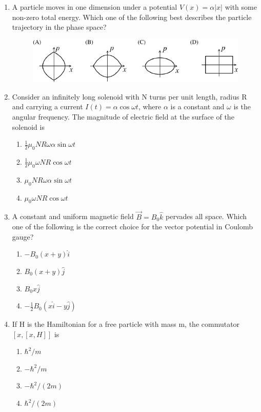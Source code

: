 \documentclass[journal,12pt,onecolumn]{IEEEtran}
\theoremstyle{remark}
\begin{document}
\begin{enumerate}
    \item A particle moves in one dimension under a potential $V(x) = \alpha |x|$ with some non-zero total energy. Which one of the following best describes the particle trajectory in the phase space?\hfill{}
    \begin{figure}[H]
        \centering
        \caption*{} \label{fig:38o} \includegraphics{figs/38.png}
    \end{figure}

    \item Consider an infinitely long solenoid with N turns per unit length, radius R and carrying a current $I(t) = \alpha \cos \omega t$, where $\alpha$ is a constant and $\omega$ is the angular frequency. The magnitude of electric field at the surface of the solenoid is
    \hfill{} \begin{enumerate}
        \item $\frac{1}{2} \mu_0 N R \omega \alpha \sin \omega t$
        \item $\frac{1}{2} \mu_0 \omega N R \cos \omega t$
        \item $\mu_0 N R \omega \alpha \sin \omega t$
        \item $\mu_0 \omega N R \cos \omega t$
    \end{enumerate}

    \item A constant and uniform magnetic field $\vec{B} = B_0 \hat{k}$ pervades all space. Which one of the following is the correct choice for the vector potential in Coulomb gauge?
    \hfill{} \begin{enumerate}
        \item $-B_0(x+y)\hat{i}$
        \item $B_0(x+y)\hat{j}$
        \item $B_0 x \hat{j}$
        \item $-\frac{1}{2}B_0(x\hat{i} - y\hat{j})$
    \end{enumerate}

    \item If H is the Hamiltonian for a free particle with mass m, the commutator $[x, [x, H]]$ is
    \hfill{} \begin{enumerate}
        \item $\hbar^2/m$
        \item $-\hbar^2/m$
        \item $-\hbar^2/(2m)$
        \item $\hbar^2/(2m)$
    \end{enumerate}


\end{enumerate}
\end{document}
